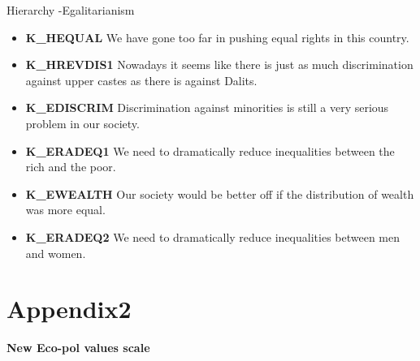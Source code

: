 \documentclass[
]{article}
\providecommand{\tightlist}{%
  \setlength{\itemsep}{0pt}\setlength{\parskip}{0pt}}
\begin{document}
Hierarchy -Egalitarianism

\begin{itemize}
\tightlist
\item
  \textbf{K\_HEQUAL} We have gone too far in pushing equal rights in
  this country.
\item
  \textbf{K\_HREVDIS1} Nowadays it seems like there is just as much
  discrimination against upper castes as there is against Dalits.
\item
  \textbf{K\_EDISCRIM} Discrimination against minorities is still a very
  serious problem in our society.
\item
  \textbf{K\_ERADEQ1} We need to dramatically reduce inequalities
  between the rich and the poor.
\item
  \textbf{K\_EWEALTH} Our society would be better off if the
  distribution of wealth was more equal.
\item
  \textbf{K\_ERADEQ2} We need to dramatically reduce inequalities
  between men and women.
\end{itemize}

\newpage

\hypertarget{appendix2}{%
\section{Appendix2}\label{appendix2}}

\textbf{New Eco-pol values scale}
\end{document}
